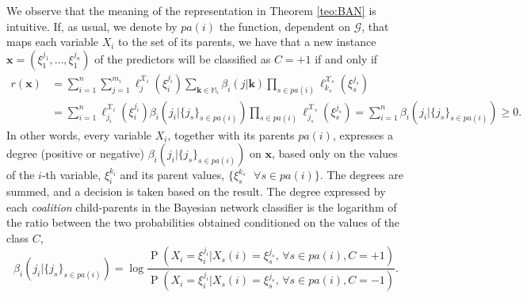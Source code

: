 \documentclass[11pt,a4paper, twoside]{book}
\newcommand{\Pp}{\operatorname{P}}
\newcommand{\nchi}{\mathcal{X}}
\begin{document}
We observe that the meaning of the representation in Theorem \ref{teo:BAN} is intuitive.
If, as usual, we denote by ${pa}(i)$ the function, dependent on $\mathcal{G}$, that maps each variable $X_i$ to the set of its parents, we have that a new instance $\mathbf{x}=(\xi_1^{j_1},\ldots,\xi_1^{j_n})$ of the predictors will be classified as $C=+1$ if and only if
\begin{align*}
 r(\mathbf{x})&=\sum_{i=1}^{n} \sum_{j=1}^{m_i}\ell_{j}^{\nchi_i}(\xi_i^{j_i}) \sum_{\mathbf{k}\in \mathbb{M}_i } \beta_{i}(j|\mathbf{k})\prod_{s\in {pa}(i)} \ell_{k_s}^{\nchi_{s}}(\xi_s^{j_s}) \\ 
 &= \sum_{i=1}^{n} \ell_{j_i}^{\nchi_i}(\xi_i^{j_i})  \beta_{i}(j_i|\{ j_s \}_{s\in {pa}(i)})\prod_{s\in {pa}(i)} \ell_{j_s}^{\nchi_{s}}(\xi_s^{j_s}){=\sum_{i=1}^{n}\beta_{i}(j_i|\{ j_s \}_{s\in {pa}(i)})}\geq 0  . \end{align*}
In other words, every variable $X_i$, together with its parents ${pa}(i)$, expresses a degree (positive or negative) $\beta_{i}(j_i|\{ j_s \}_{s\in {pa}(i)})$ on $\mathbf{x}$, based only on the values of the $i$-th variable, $\xi_i^{k_i}$ and its parent values, $\{ \xi_s^{k_s} \text{ }\forall s\in {pa}(i)\}$. The degrees are summed, and a decision is taken based on the result.
The degree expressed by each \textit{coalition} child-parents in the Bayesian network classifier is the logarithm of the ratio between the two probabilities obtained conditioned on the values of the class $C$,
\[ \beta_{i}(j_i|\{ j_s \}_{s\in {pa}(i)})=\log \frac{\Pp(X_i=\xi_i^{j_i}|{X}_{s}(i)=\xi_s^{j_s}\text{, } \forall s\in {pa}(i), C=+1)}{\Pp(X_i=\xi_i^{j_i}|{X}_{s}(i)=\xi_s^{j_s}\text{, } \forall s\in {pa}(i), C=-1)} .\]
\end{document}
